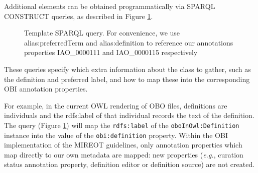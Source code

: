 \documentclass[a4paper,10pt,twocolumn]{article}
\newcommand{\protege}{Prot\'{e}g\'{e}}
\begin{document}





Additional elements can be obtained programmatically via SPARQL\cite{RefWorks:1531} CONSTRUCT queries, as described in Figure \ref{fig:sparql}.




\begin{figure}[t]
%  
\scriptsize
 
\caption{Template SPARQL query. For convenience, we use alias:preferredTerm and
alias:definition to reference our annotations properties IAO\_0000111 and IAO\_0000115 respectively}
\label{fig:sparql}
\end{figure}
These queries specify which extra information about the class to gather, such as the definition and preferred label, and how to map these into the corresponding OBI annotation properties. 

For example, in the current \ac{OWL} rendering of \ac{OBO} files, definitions are individuals and the rdfs:label of that individual records the text of the definition. %
The query (Figure \ref{fig:sparql}) will map the \texttt{rdfs:label} of the \texttt{oboInOwl:Definition} instance into the value of the \texttt{obi:definition} property.
Within the \ac{OBI} implementation of the \ac{MIREOT} guidelines, only annotation properties which map directly to our own metadata are mapped: new properties (\emph{e.g.}, curation status annotation property, definition editor or definition source) are not created.
\end{document}
